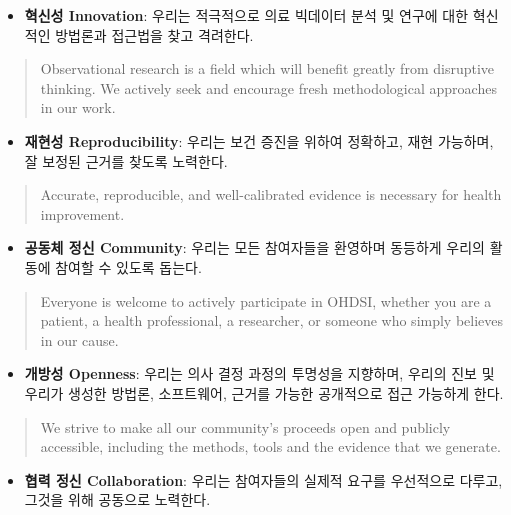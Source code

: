 \documentclass[11pt]{book}
\providecommand{\tightlist}{%
  \setlength{\itemsep}{0pt}\setlength{\parskip}{0pt}}
\theoremstyle{definition}
\theoremstyle{definition}
\theoremstyle{definition}
\theoremstyle{remark}
\begin{document}
\begin{itemize}
\tightlist
\item
  \textbf{혁신성 Innovation}: 우리는 적극적으로 의료 빅데이터 분석 및
  연구에 대한 혁신적인 방법론과 접근법을 찾고 격려한다.
\end{itemize}

\begin{quote}
Observational research is a field which will benefit greatly from
disruptive thinking. We actively seek and encourage fresh methodological
approaches in our work.
\end{quote}

\begin{itemize}
\tightlist
\item
  \textbf{재현성 Reproducibility}: 우리는 보건 증진을 위하여 정확하고,
  재현 가능하며, 잘 보정된 근거를 찾도록 노력한다.
\end{itemize}

\begin{quote}
Accurate, reproducible, and well-calibrated evidence is necessary for
health improvement.
\end{quote}

\begin{itemize}
\tightlist
\item
  \textbf{공동체 정신 Community}: 우리는 모든 참여자들을 환영하며
  동등하게 우리의 활동에 참여할 수 있도록 돕는다.
\end{itemize}

\begin{quote}
Everyone is welcome to actively participate in OHDSI, whether you are a
patient, a health professional, a researcher, or someone who simply
believes in our cause.
\end{quote}

\begin{itemize}
\tightlist
\item
  \textbf{개방성 Openness}: 우리는 의사 결정 과정의 투명성을 지향하며,
  우리의 진보 및 우리가 생성한 방법론, 소프트웨어, 근거를 가능한
  공개적으로 접근 가능하게 한다.
\end{itemize}

\begin{quote}
We strive to make all our community's proceeds open and publicly
accessible, including the methods, tools and the evidence that we
generate.
\end{quote}

\begin{itemize}
\tightlist
\item
  \textbf{협력 정신 Collaboration}: 우리는 참여자들의 실제적 요구를
  우선적으로 다루고, 그것을 위해 공동으로 노력한다.
\end{itemize}
\end{document}
